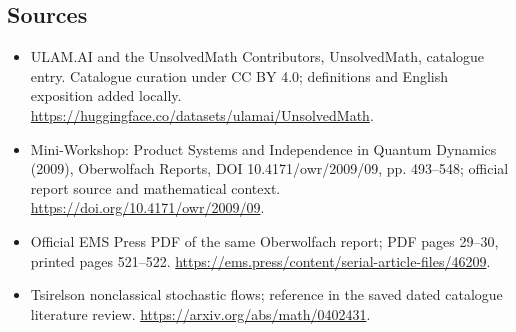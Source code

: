 \documentclass[11pt]{article}
\begin{document}
\subsection{Sources}
\begin{itemize}
\item[\hypertarget{source:statement:1}{S1}] ULAM.AI and the UnsolvedMath Contributors, UnsolvedMath, catalogue entry. Catalogue curation under CC BY 4.0; definitions and English exposition added locally.
\url{https://huggingface.co/datasets/ulamai/UnsolvedMath}.
\item[\hypertarget{source:statement:2}{S2}] Mini-Workshop: Product Systems and Independence in Quantum Dynamics (2009), Oberwolfach Reports, DOI 10.4171/owr/2009/09, pp. 493--548; official report source and mathematical context.
\url{https://doi.org/10.4171/owr/2009/09}.
\item[\hypertarget{source:statement:3}{S3}] Official EMS Press PDF of the same Oberwolfach report; PDF pages 29--30, printed pages 521--522.
\url{https://ems.press/content/serial-article-files/46209}.
\item[\hypertarget{source:statement:4}{S4}] Tsirelson nonclassical stochastic flows; reference in the saved dated catalogue literature review.
\url{https://arxiv.org/abs/math/0402431}.
\end{itemize}
\label{end:statement}
\end{document}
